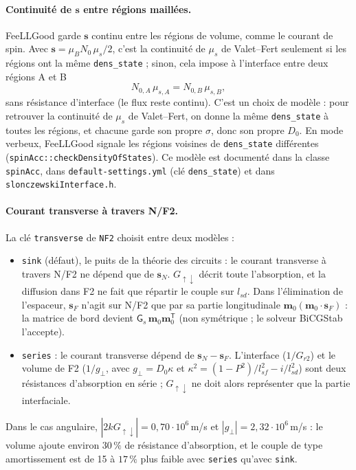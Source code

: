 \documentclass[11pt,a4paper]{article}
\newcommand{\vm}{\bm{m}}
\newcommand{\vs}{\bm{s}}
\newcommand{\mG}{\mathsf{G}}
\begin{document}
\paragraph{Continuité de $\vs$ entre régions maillées.} FeeLLGood garde
$\vs$ continu entre les régions de volume, comme le courant de spin. Avec
$\vs = \mu_BN_0\,\mu_s/2$, c'est la continuité de $\mu_s$ de Valet--Fert
seulement si les régions ont la même \texttt{dens\_state} ; sinon, cela
impose à l'interface entre deux régions A et B
\begin{equation}
  N_{0,A}\,\mu_{s,A} = N_{0,B}\,\mu_{s,B},
  \label{eq:s-continu}
\end{equation}
sans résistance d'interface (le flux reste continu). C'est un choix de
modèle : pour retrouver la continuité de $\mu_s$ de Valet--Fert, on donne la
même \texttt{dens\_state} à toutes les régions, et chacune garde son propre
$\sigma$, donc son propre $D_0$. En mode verbeux, FeeLLGood signale les
régions voisines de \texttt{dens\_state} différentes
(\texttt{spinAcc::checkDensityOfStates}). Ce modèle est documenté dans la
classe \texttt{spinAcc}, dans \texttt{default-settings.yml} (clé
\texttt{dens\_state}) et dans \texttt{slonczewskiInterface.h}.

\paragraph{Courant transverse à travers N/F2.}
\label{sec:transverse}
La clé \texttt{transverse} de \texttt{NF2} choisit entre deux modèles :
\begin{itemize}
  \item \texttt{sink} (défaut), le \og puits \fg{} de la théorie des
    circuits : le courant transverse à travers N/F2 ne dépend que de
    $\vs_N$. $G_{\uparrow\downarrow}$ décrit toute l'absorption, et la
    diffusion dans F2 ne fait que répartir le couple sur $l_{sd}$. Dans
    l'élimination de l'espaceur, $\vs_F$ n'agit sur N/F2 que par sa partie
    longitudinale $\vm_0(\vm_0\cdot\vs_F)$ : la matrice de bord devient
    $\mG_s\,\vm_0\vm_0^{\mathsf T}$ (non symétrique ; le solveur BiCGStab
    l'accepte).
  \item \texttt{series} : le courant transverse dépend de
    $\vs_N-\vs_F$. L'interface ($1/G_{r2}$) et le volume de F2
    ($1/g_\perp$, avec $g_\perp = D_0\kappa$ et
    $\kappa^2 = (1-P^2)/l_{sf}^2 - i/l_{sd}^2$) sont deux résistances
    d'absorption en série ; $G_{\uparrow\downarrow}$ ne doit alors
    représenter que la partie interfaciale.
\end{itemize}
Dans le cas angulaire, $|2kG_{\uparrow\downarrow}| = 0{,}70\cdot10^6$\,m/s
et $|g_\perp| = 2{,}32\cdot10^6$\,m/s : le volume ajoute environ $30\,\%$
de résistance d'absorption, et le couple de type amortissement est de 15 à
$17\,\%$ plus faible avec \texttt{series} qu'avec \texttt{sink}.
\end{document}
